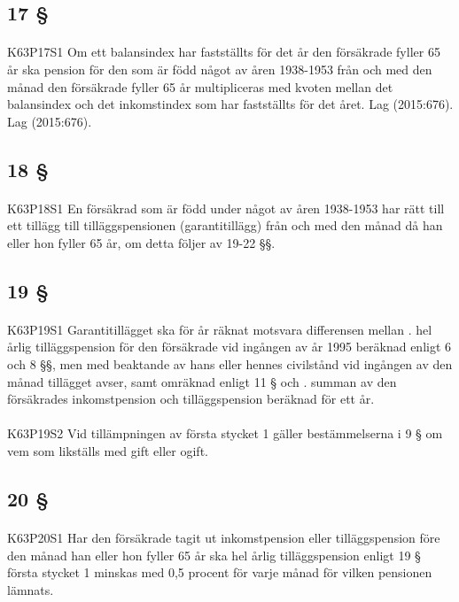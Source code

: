 \documentclass[a4paper,notitlepage,openany,10pt]{book}
\begin{document}
\subsection*{17 §}
\paragraph*{}
{\tiny K63P17S1}
Om ett balansindex har fastställts för det år den försäkrade fyller 65 år ska pension för den som är född något av åren 1938-1953 från och med den månad den försäkrade fyller 65 år multipliceras med kvoten mellan det balansindex och det inkomstindex som har fastställts för det året.
Lag (2015:676).
Lag (2015:676).
\subsection*{18 §}
\paragraph*{}
{\tiny K63P18S1}
En försäkrad som är född under något av åren 1938-1953 har rätt till ett tillägg till tilläggspensionen (garantitillägg) från och med den månad då han eller hon fyller 65 år, om detta följer av 19-22 §§.
\subsection*{19 §}
\paragraph*{}
{\tiny K63P19S1}
Garantitillägget ska för år räknat motsvara differensen mellan
. hel årlig tilläggspension för den försäkrade vid ingången av år 1995 beräknad enligt 6 och 8 §§, men med beaktande av hans eller hennes civilstånd vid ingången av den månad tillägget avser, samt omräknad enligt 11 § och
. summan av den försäkrades inkomstpension och tilläggspension beräknad för ett år.
\paragraph*{}
{\tiny K63P19S2}
Vid tillämpningen av första stycket 1 gäller bestämmelserna i 9 § om vem som likställs med gift eller ogift.
\subsection*{20 §}
\paragraph*{}
{\tiny K63P20S1}
Har den försäkrade tagit ut inkomstpension eller tilläggspension före den månad han eller hon fyller 65 år ska hel årlig tilläggspension enligt 19 § första stycket 1 minskas med 0,5 procent för varje månad för vilken pensionen lämnats.
\end{document}
